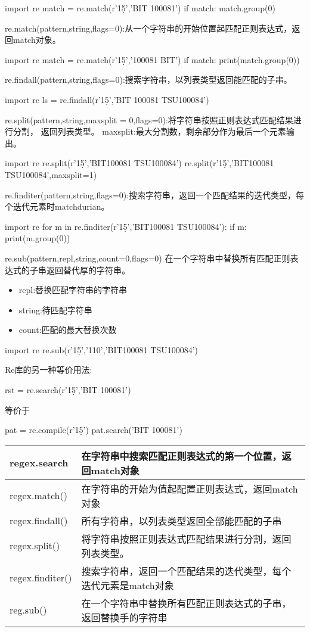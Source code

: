 \begin{python}
import re
match = re.match(r'1\d{5}','BIT 100081')
if match:
    match.group(0)
\end{python}
re.match(pattern,string,flags=0):从一个字符串的开始位置起匹配正则表达式，返回match对象。
\begin{python}
import re
match = re.match(r'1\d{5}','100081 BIT')
if match:
    print(match.group(0))
\end{python}
re.findall(pattern,string,flags=0):搜索字符串，以列表类型返回能匹配的子串。
\begin{python}
import re
ls = re.findall(r'1\d{5}','BIT 100081 TSU100084')
\end{python}
re.split(pattern,string,maxsplit = 0,flags=0):将字符串按照正则表达式匹配结果进行分割，
返回列表类型。\newline
maxsplit:最大分割数，剩余部分作为最后一个元素输出。\newline
\begin{python}
import re
re.split(r'1\d{5}','BIT100081 TSU100084')
re.split(r'1\d{5}','BIT100081 TSU100084',maxsplit=1)
\end{python}
re.finditer(pattern,string,flags=0):搜索字符串，返回一个匹配结果的迭代类型，每个迭代元素时matchdurian。
\begin{python}
import re
for m in re.finditer(r'1\d{5}','BIT100081 TSU100084'):
    if m:
        print(m.group(0))
\end{python}
re.sub(pattern,repl,string,count=0,flags=0)
在一个字符串中替换所有匹配正则表达式的子串返回替代厚的字符串。
\begin{itemize}
\item repl:替换匹配字符串的字符串
\item string:待匹配字符串
\item count:匹配的最大替换次数
\end{itemize}
\begin{python}
import re
re.sub(r'1\d{5}','110','BIT100081 TSU100084')
\end{python}
Re库的另一种等价用法:
\begin{python}
rst = re.search(r'1\d{5}','BIT 100081')
\end{python}
等价于
\begin{python}
pat = re.compile(r'1\d{5}')
pat.search('BIT 100081')
\end{python}
\begin{center}
\begin{tabular}{|l|l|}
\hline
regex.search&在字符串中搜索匹配正则表达式的第一个位置，返回match对象\\
\hline
regex.match()&在字符串的开始为值起配置正则表达式，返回match对象\\
\hline
regex.findall()&所有字符串，以列表类型返回全部能匹配的子串\\
\hline
regex.split()&将字符串按照正则表达式匹配结果进行分割，返回列表类型。\\
\hline
regex.finditer()&搜索字符串，返回一个匹配结果的迭代类型，每个迭代元素是match对象\\
\hline
reg.sub()&在一个字符串中替换所有匹配正则表达式的子串，返回替换手的字符串\\
\hline
\end{tabular}
\end{center}
